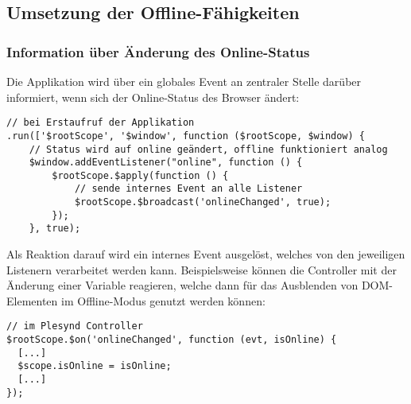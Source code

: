 \subsection{Umsetzung der Offline-Fähigkeiten}\label{section:offline_faehigkeiten}

\subsubsection*{Information über Änderung des Online-Status}
Die Applikation wird über ein globales Event an zentraler Stelle darüber informiert, wenn sich der Online-Status des Browser ändert:
\begin{lstlisting}
// bei Erstaufruf der Applikation
.run(['$rootScope', '$window', function ($rootScope, $window) {
    // Status wird auf online geändert, offline funktioniert analog
    $window.addEventListener("online", function () {
        $rootScope.$apply(function () {
            // sende internes Event an alle Listener
            $rootScope.$broadcast('onlineChanged', true);
        });
    }, true);
\end{lstlisting}

Als Reaktion darauf wird ein internes Event ausgelöst, welches von den jeweiligen Listenern verarbeitet werden kann. Beispielsweise können die Controller mit der Änderung einer Variable reagieren, welche dann für das Ausblenden von \ac{DOM}-Elementen im Offline-Modus genutzt werden können:
\begin{lstlisting}
// im Plesynd Controller
$rootScope.$on('onlineChanged', function (evt, isOnline) {
  [...]
  $scope.isOnline = isOnline;
  [...]
});
\end{lstlisting}

